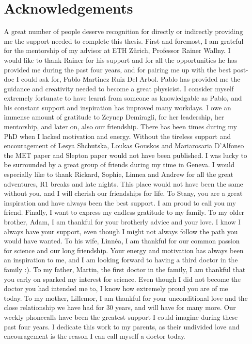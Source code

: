 \chapter*{Acknowledgements}
\noindent\justify
A great number of people deserve recognition for directly or indirectly providing me the support needed to complete this thesis. 
First and foremost, I am grateful for the mentorship of my advisor at ETH Z\"{u}rich, Professor Rainer Wallny. 
I would like to thank Rainer for his support and for all the opportunities he has provided me during the past four years, and for pairing me up with the best post-doc I could ask for, Pablo Martinez Ruiz Del Arbol.
Pablo has provided me the guidance and creativity needed to become a great physicist. 
I consider myself extremely fortunate to have learnt from someone as knowledgable as Pablo, and his constant support and inspiration has improved many workdays. 
I owe an immense amount of gratitude to Zeynep Demiragli, for her leadership, her mentorship, and later on, also our friendship. 
There has been times during my PhD when I lacked motivation and energy. 
Without the tireless support and encouragement of Lesya Shchutska, Loukas Gouskos and Mariarosaria D'Alfonso the MET paper and Slepton paper would not have been published.  
\newpara
\noindent\justify
I was lucky to be surrounded by a great group of friends during my time in Geneva. 
I would especially like to thank Rickard, Sophie, Linnea and Andrew for all the great adventures, R1 breaks and late nights. 
This place would not have been the same without you, and I will cherish our friendships for life. 
To Stany, you are a great inspiration and have always been the best support. I am proud to call you my friend. 
\newpara
\noindent\justify
Finally, I want to express my endless gratitude to my family.
To my older brother, Adam, I am thankful for your brotherly advice and your love. 
I know I always have your support, even though I might not always follow the path you would have wanted. 
To his wife, Linn\'{e}a, I am thankful for our common passion for science and our long friendship. 
Your energy and motivation has always been an inspiration to me, and I am looking forward to having a third doctor in the family :).
To my father, Martin, the first doctor in the family, I am thankful that you early on sparked my interest for science. 
Even though I did not become the doctor you had intended me to, I know how extremely proud you are of me today. 
To my mother, Lillemor, I am thankful for your unconditional love and the close relationship we have had for 30 years, and will have for many more. 
Our weekly phonecalls have been the greatest support I could imagine during these past four years. 
I dedicate this work to my parents, as their undivided love and encouragement is the reason I can call myself a doctor today. 

